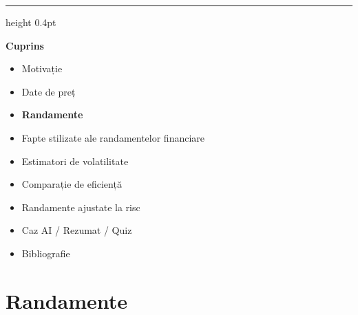\documentclass[9pt, aspectratio=169, t]{beamer}
\theoremstyle{definition}
\begin{document}
{
\begin{frame}{}
    {\color{FooterGray}\hrule height 0.4pt}
    \vspace{0.1cm}
    {\Large\textcolor{IDAred}{\textbf{Cuprins}}}
    \vspace{0.2cm}
    \begin{itemize}
        \item Motivație \checkmark
        \item Date de preț \checkmark
        \item \textbf{Randamente}
        \item Fapte stilizate ale randamentelor financiare
        \item Estimatori de volatilitate
        \item Comparație de eficiență
        \item Randamente ajustate la risc
        \item Caz AI / Rezumat / Quiz
        \item Bibliografie
    \end{itemize}
\end{frame}
}

\section{Randamente}
\end{document}
